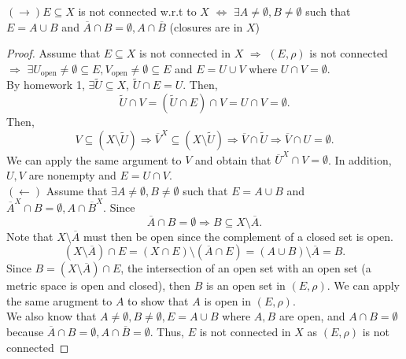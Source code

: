 \documentclass[a4paper]{article}
\begin{document}
\begin{prop}
  $\left( \to \right) E \subseteq X$ is not connected w.r.t to $X$  $\iff$ $\exists A \neq \emptyset, B \neq \emptyset$ such that $E = A \cup B$ and $\overline{A} \cap B = \emptyset, A \cap \overline{B}$ (closures are in $X$)

  \begin{proof}
    Assume that $E \subseteq X$ is not connected in $X$ $\Rightarrow$ $\left( E, \rho \right) $ is not connected $\Rightarrow$ $\exists U_{\text{open}} \neq \emptyset \subseteq E, V_{\text{open}} \neq \emptyset \subseteq E$ and $E = U \cup V$ where  $U \cap V = \emptyset$. \\

    By homework 1, $\exists \tilde{U} \subseteq X$, $\tilde{U} \cap E = U$. Then,
     \[
       \tilde{U} \cap V = \left( \tilde{U} \cap E \right) \cap V = U \cap V = \emptyset 
    .\]
    Then,
    \[
      V \subseteq \left( X \setminus \tilde{U} \right) \Rightarrow \overline{V}^{X} \subseteq \left( X \setminus \tilde{U} \right) \Rightarrow \overline{V}  \cap \tilde{U} \Rightarrow \overline{V} \cap U = \emptyset
    .\] 
    We can apply the same argument to $V$ and obtain that  $\overline{U}^{X} \cap V = \emptyset$. In addition, $U,V$ are nonempty and  $E = U \cap V$. \\


    $\left( \leftarrow \right) $ Assume that $\exists A \neq \emptyset, B \neq \emptyset$ such that $E = A \cup B$ and $\overline{A}^{X} \cap B = \emptyset, A \cap \overline{B}^{X}$. Since 
    \[
    \overline{A} \cap B = \emptyset \Rightarrow B \subseteq X \setminus \overline{A}
    .\] 
    Note that $X \setminus \overline{A}$ must then be open since the complement of a closed set is open.
    \[
      \left( X \setminus \overline{A} \right) \cap E = \left( X \cap E \right) \setminus \left( \overline{A} \cap E \right) = \left( A \cup B \right)  \setminus \overline{A} = B
    .\]
    Since $B = \left( X \setminus \overline{A} \right)  \cap E$, the intersection of an open set with an open set (a metric space is open and closed), then $B$ is an open set in  $\left( E, \rho \right) $. We can apply the same arugment to $A$ to show that  $A$ is open in  $\left( E, \rho \right) $. \\

    We also know that $A \neq \emptyset, B \neq \emptyset, E = A \cup B$ where $A,B$ are open, and  $A \cap B = \emptyset$ because $\overline{A} \cap B = \emptyset, A \cap \overline{B} = \emptyset$. Thus, $E$ is not connected in  $X$ as  $(E, \rho)$ is not connected
  \end{proof}
\end{prop}
\end{document}
